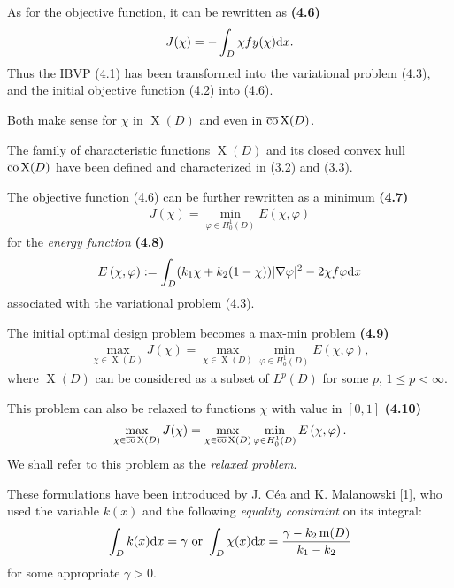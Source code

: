 \documentclass{book}
\numberwithin{equation}{section}
\begin{document}
\begin{enumerate}
    As for the objective function, it can be rewritten as \textbf{(4.6)}
    \begin{align*}
        J(\chi) = -\int_D \chi fy(\chi){\rm d}x.
    \end{align*}
    Thus the IBVP (4.1) has been transformed into the variational problem (4.3), and the initial objective function (4.2) into (4.6).
    
    Both make sense for $\chi$ in $\operatorname{X}(D)$ and even in $\overline{\rm co}\operatorname{X}(D)$.
    
    The family of characteristic functions $\operatorname{X}(D)$ and its closed convex hull $\overline{\rm co}\operatorname{X}(D)$ have been defined and characterized in (3.2) and (3.3).
    
    The objective function (4.6) can be further rewritten as a minimum \textbf{(4.7)}
    \begin{align*}
        J(\chi) = \min_{\varphi\in H_0^1(D)} E(\chi,\varphi)
    \end{align*}
    for the \textit{energy function} \textbf{(4.8)}
    \begin{align*}
        E\left(\chi,\varphi\right) := \int_D (k_1\chi + k_2(1 - \chi))|\nabla\varphi|^2 - 2\chi f\varphi{\rm d}x
    \end{align*}
    associated with the variational problem (4.3).
    
    The initial optimal design problem becomes a max-min problem \textbf{(4.9)}
    \begin{align*}
        \max_{\chi\in\operatorname{X}(D)} J(\chi) = \max_{\chi\in\operatorname{X}(D)} \min_{\varphi\in H_0^1(D)} E\left(\chi,\varphi\right),
    \end{align*}
    where $\operatorname{X}(D)$ can be considered as a subset of $L^p(D)$ for some $p$, $1\le p < \infty$.
    
    This problem can also be relaxed to functions $\chi$ with value in $[0,1]$ \textbf{(4.10)}
    \begin{align*}
        \max_{\chi\in\overline{\rm co}\operatorname{X}(D)} J(\chi) = \max_{\chi\in\overline{\rm co}\operatorname{X}(D)} \min_{\varphi\in H_0^1(D)} E\left(\chi,\varphi\right).
    \end{align*}
    We shall refer to this problem as the \textit{relaxed problem}.
    
    These formulations have been introduced by J. Céa and K. Malanowski [1], who used the variable $k(x)$ and the following \textit{equality constraint} on its integral:
    \begin{align*}
        \int_D k(x){\rm d}x = \gamma \mbox{ or } \int_D \chi(x){\rm d}x = \frac{\gamma - k_2\operatorname{m}(D)}{k_1 - k_2}
    \end{align*}
    for some appropriate $\gamma > 0$.
    

\end{enumerate}
\end{document}
